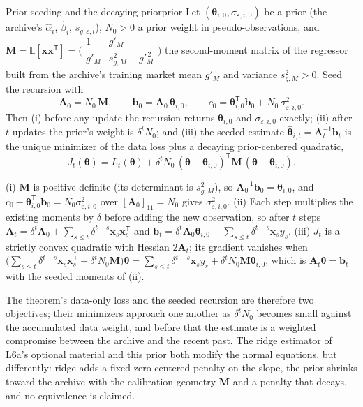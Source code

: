 \documentclass[11pt]{article}
\newcommand{\E}{\mathbb{E}}
\newcommand{\bx}{\mathbf x}
\newcommand{\bA}{\mathbf A}
\newcommand{\bb}{\mathbf b}
\newcommand{\bM}{\mathbf M}
\newcommand{\bth}{\boldsymbol\theta}
\begin{document}
\begin{proposition}{Prior seeding and the decaying prior}{prior}
Let $(\bth_{i,0},\sigma_{\varepsilon,i,0})$ be a prior (the archive's $\hat\alpha_i$, $\hat\beta_i$, $s_{g,\varepsilon,i}$), $N_0>0$ a prior weight in pseudo-observations, and $\bM=\E[\bx\bx^{\mathsf T}]=\bigl(\begin{smallmatrix}1&g'_M\\ g'_M&s^2_{g,M}+g'^{\,2}_M\end{smallmatrix}\bigr)$ the second-moment matrix of the regressor built from the archive's training market mean $g'_M$ and variance $s^2_{g,M}>0$. Seed the recursion with
\begin{equation}
  \label{eq:seed}
  \bA_0=N_0\,\bM,\qquad \bb_0=\bA_0\,\bth_{i,0},\qquad c_0=\bth_{i,0}^{\mathsf T}\bb_0+N_0\,\sigma^2_{\varepsilon,i,0}.
\end{equation}
Then (i) before any update the recursion returns $\bth_{i,0}$ and $\sigma_{\varepsilon,i,0}$ exactly; (ii) after $t$ updates the prior's weight is $\delta^tN_0$; and (iii) the seeded estimate $\hat{\bth}_{i,t}=\bA_t^{-1}\bb_t$ is the unique minimizer of the data loss plus a decaying prior-centered quadratic,
\begin{equation}
  \label{eq:seeded-objective}
  J_t(\bth)=L_t(\bth)+\delta^{t}N_0\,(\bth-\bth_{i,0})^{\mathsf T}\bM\,(\bth-\bth_{i,0}).
\end{equation}
\end{proposition}

\begin{derivation}
(i) $\bM$ is positive definite (its determinant is $s^2_{g,M}$), so $\bA_0^{-1}\bb_0=\bth_{i,0}$, and $c_0-\bth_{i,0}^{\mathsf T}\bb_0=N_0\sigma^2_{\varepsilon,i,0}$ over $[\bA_0]_{11}=N_0$ gives $\sigma^2_{\varepsilon,i,0}$. (ii) Each step multiplies the existing moments by $\delta$ before adding the new observation, so after $t$ steps $\bA_t=\delta^t\bA_0+\sum_{s\le t}\delta^{t-s}\bx_s\bx_s^{\mathsf T}$ and $\bb_t=\delta^t\bA_0\bth_{i,0}+\sum_{s\le t}\delta^{t-s}\bx_sy_s$. (iii) $J_t$ is a strictly convex quadratic with Hessian $2\bA_t$; its gradient vanishes when $\bigl(\sum_{s\le t}\delta^{t-s}\bx_s\bx_s^{\mathsf T}+\delta^tN_0\bM\bigr)\bth=\sum_{s\le t}\delta^{t-s}\bx_sy_s+\delta^tN_0\bM\bth_{i,0}$, which is $\bA_t\bth=\bb_t$ with the seeded moments of (ii).
\end{derivation}

The theorem's data-only loss and the seeded recursion are therefore two objectives; their minimizers approach one another as $\delta^tN_0$ becomes small against the accumulated data weight, and before that the estimate is a weighted compromise between the archive and the recent past. The ridge estimator of L6a's optional material and this prior both modify the normal equations, but differently: ridge adds a fixed zero-centered penalty on the slope, the prior shrinks toward the archive with the calibration geometry $\bM$ and a penalty that decays, and no equivalence is claimed.
\end{document}
